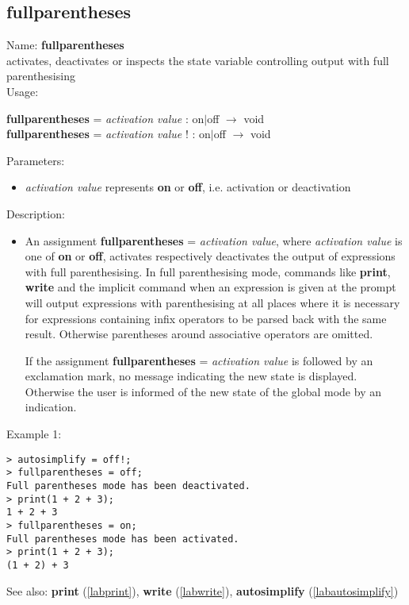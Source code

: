 \subsection{fullparentheses}
\label{labfullparentheses}
\noindent Name: \textbf{fullparentheses}\\
activates, deactivates or inspects the state variable controlling output with full parenthesising\\

\noindent Usage: 
\begin{center}
\textbf{fullparentheses} = \emph{activation value} : \textsf{on$|$off} $\rightarrow$ \textsf{void}\\
\textbf{fullparentheses} = \emph{activation value} ! : \textsf{on$|$off} $\rightarrow$ \textsf{void}\\
\end{center}
Parameters: 
\begin{itemize}
\item \emph{activation value} represents \textbf{on} or \textbf{off}, i.e. activation or deactivation
\end{itemize}
\noindent Description: \begin{itemize}

\item An assignment \textbf{fullparentheses} = \emph{activation value}, where \emph{activation value}
   is one of \textbf{on} or \textbf{off}, activates respectively deactivates the output
   of expressions with full parenthesising. In full parenthesising mode,
   \sollya commands like \textbf{print}, \textbf{write} and the implicit command when an
   expression is given at the prompt will output expressions with
   parenthesising at all places where it is necessary for expressions
   containing infix operators to be parsed back with the same
   result. Otherwise parentheses around associative operators are
   omitted.
    
   If the assignment \textbf{fullparentheses} = \emph{activation value} is followed by an
   exclamation mark, no message indicating the new state is
   displayed. Otherwise the user is informed of the new state of the
   global mode by an indication.
\end{itemize}
\noindent Example 1: 
\begin{center}\begin{minipage}{15cm}\begin{Verbatim}[frame=single]
> autosimplify = off!;
> fullparentheses = off;
Full parentheses mode has been deactivated.
> print(1 + 2 + 3);
1 + 2 + 3
> fullparentheses = on;
Full parentheses mode has been activated.
> print(1 + 2 + 3);
(1 + 2) + 3
\end{Verbatim}
\end{minipage}\end{center}
See also: \textbf{print} (\ref{labprint}), \textbf{write} (\ref{labwrite}), \textbf{autosimplify} (\ref{labautosimplify})
